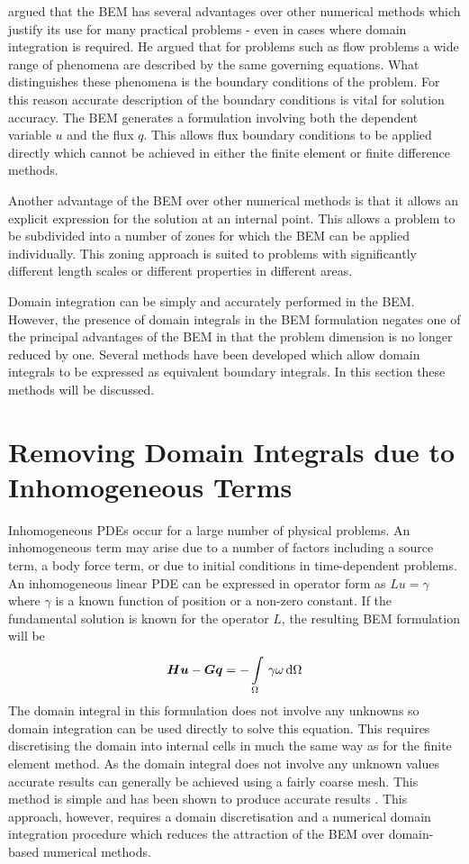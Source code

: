 \citet{wu:1985} argued that the BEM has several advantages over
other numerical methods which justify its use for many practical problems -
even in cases where domain integration is required.  He argued that for
problems such as flow problems a wide range of phenomena are described by
the same governing equations. What distinguishes these phenomena is the
boundary conditions of the problem.  For this reason accurate description
of the boundary conditions is vital for solution accuracy.  The BEM
generates a formulation involving both the dependent variable $u$ and the
flux $q$. This allows flux boundary conditions to be applied directly which
cannot be achieved in either the finite element or finite difference
methods.

Another advantage of the BEM over other numerical methods is that it allows an
explicit expression for the solution at an internal point.  This allows a
problem to be subdivided into a number of zones for which the BEM can be
applied individually.  This zoning approach is suited to problems with
significantly different length scales or different properties in different
areas.

Domain integration can be simply and accurately performed in the BEM.
However, the presence of domain integrals in the BEM formulation negates
one of the principal advantages of the BEM in that the problem dimension is
no longer reduced by one.  Several methods have been developed which allow
domain integrals to be expressed as equivalent boundary integrals. In this
section these methods will be discussed.

\section{Removing Domain Integrals due to Inhomogeneous Terms}

Inhomogeneous PDEs occur for a large number of physical problems.  An
inhomogeneous term may arise due to a number of factors including a source
term, a body force term, or due to initial conditions in time-dependent
problems.  An inhomogeneous linear PDE can be expressed in operator form as
$Lu = \gamma$ where $\gamma$ is a known function of position or a non-zero
constant.  If the fundamental solution is known for the operator $L$, the
resulting BEM formulation will be
\begin{equation}
  \matr{H} \vect{u} - \matr{G} \vect{q} = -\goneint{\gamma \omega}{\Omega}
\label{eq:inhomog}
\end{equation}
The domain integral in this formulation does not involve any unknowns so
domain integration can be used directly to solve this equation.  This
requires discretising the domain into internal cells in much the same way
as for the finite element method.  As the domain integral does not involve
any unknown values accurate results can generally be achieved using a
fairly coarse mesh.  This method is simple and has been shown to produce
accurate results \citep{brebbia:1984b}.  This approach, however, requires a
domain discretisation and a numerical domain integration procedure which
reduces the attraction of the BEM over domain-based numerical methods.

